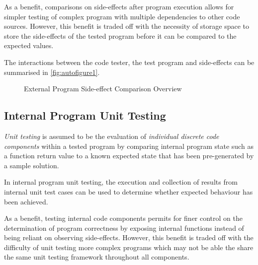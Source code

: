 \documentclass[hidelinks]{report}
\begin{document}
As a benefit, comparisons on side-effects after program execution allows for simpler testing of complex program with multiple dependencies to other code sources. However, this benefit is traded off with the necessity of storage space to store the side-effects of the tested program before it can be compared to the expected values.

The interactions between the code tester, the test program and side-effects can be summarised in \autoref{fig:autofigure1}.

\begin{figure}[h]
	\centering
	\caption{External Program Side-effect Comparison Overview}
	\label{fig:autofigure1}
\end{figure}


\subsection{Internal Program Unit Testing}

\textit{Unit testing} is assumed to be the evaluation of \textit{individual discrete code components} within a tested program by comparing internal program state such as a function return value to a known expected state that has been pre-generated by a sample solution.

In internal program unit testing, the execution and collection of results from internal unit test cases can be used to determine whether expected behaviour has been achieved.

As a benefit, testing internal code components permits for finer control on the determination of program correctness by exposing internal functions instead of being reliant on observing side-effects. However, this benefit is traded off with the difficulty of unit testing more complex programs which may not be able the share the same unit testing framework throughout all components.
\end{document}
